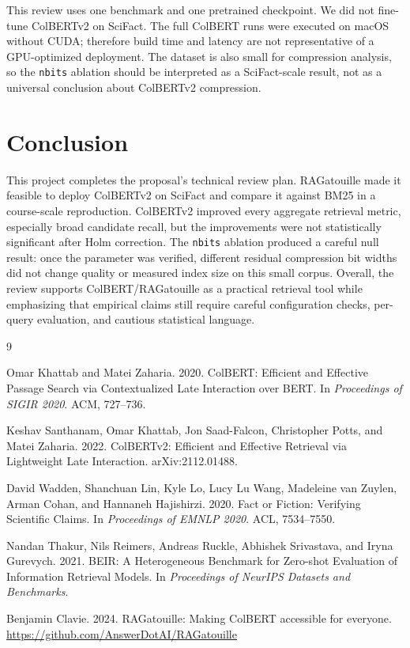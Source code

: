 \documentclass[sigconf,nonacm]{acmart}
\begin{document}
This review uses one benchmark and one pretrained checkpoint. We did not
fine-tune ColBERTv2 on SciFact. The full ColBERT runs were executed on macOS
without CUDA; therefore build time and latency are not representative of a
GPU-optimized deployment. The dataset is also small for compression analysis,
so the \texttt{nbits} ablation should be interpreted as a SciFact-scale result,
not as a universal conclusion about ColBERTv2 compression.

\section{Conclusion}

This project completes the proposal's technical review plan. RAGatouille made
it feasible to deploy ColBERTv2 on SciFact and compare it against BM25 in a
course-scale reproduction. ColBERTv2 improved every aggregate retrieval metric,
especially broad candidate recall, but the improvements were not statistically
significant after Holm correction. The \texttt{nbits} ablation produced a
careful null result: once the parameter was verified, different residual
compression bit widths did not change quality or measured index size on this
small corpus. Overall, the review supports ColBERT/RAGatouille as a practical
retrieval tool while emphasizing that empirical claims still require careful
configuration checks, per-query evaluation, and cautious statistical language.

\begin{thebibliography}{9}

Omar Khattab and Matei Zaharia. 2020. ColBERT: Efficient and Effective Passage
Search via Contextualized Late Interaction over BERT. In \textit{Proceedings of
SIGIR 2020}. ACM, 727--736.

Keshav Santhanam, Omar Khattab, Jon Saad-Falcon, Christopher Potts, and Matei
Zaharia. 2022. ColBERTv2: Efficient and Effective Retrieval via Lightweight Late
Interaction. arXiv:2112.01488.

David Wadden, Shanchuan Lin, Kyle Lo, Lucy Lu Wang, Madeleine van Zuylen, Arman
Cohan, and Hannaneh Hajishirzi. 2020. Fact or Fiction: Verifying Scientific
Claims. In \textit{Proceedings of EMNLP 2020}. ACL, 7534--7550.

Nandan Thakur, Nils Reimers, Andreas Ruckle, Abhishek Srivastava, and Iryna
Gurevych. 2021. BEIR: A Heterogeneous Benchmark for Zero-shot Evaluation of
Information Retrieval Models. In \textit{Proceedings of NeurIPS Datasets and
Benchmarks}.

Benjamin Clavie. 2024. RAGatouille: Making ColBERT accessible for everyone.
\url{https://github.com/AnswerDotAI/RAGatouille}

\end{thebibliography}
\end{document}
